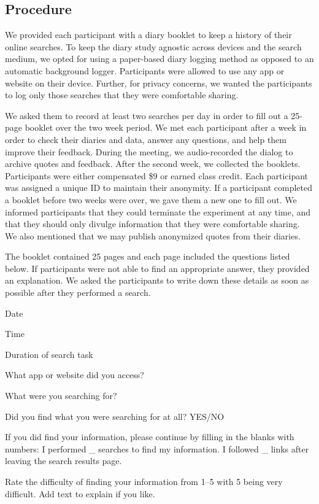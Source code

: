 \subsection{Procedure}
We provided each participant with a diary booklet to keep a history of their online searches. To keep the diary study agnostic across devices and the search medium, we opted for using a paper-based diary logging method as opposed to an automatic background logger. Participants were allowed to use any app or website on their device. Further, for privacy concerns, we wanted the participants to log only those searches that they were comfortable sharing. 

We asked them to record at least two searches per day in order to fill out a 25-page booklet over the two week period. We met each participant after a week in order to check their diaries and data, answer any questions, and help them improve their feedback. During the meeting, we audio-recorded the dialog to archive quotes and feedback. After the second week, we collected the booklets. Participants were either compensated \$9 or earned class credit. Each participant was assigned a unique ID to maintain their anonymity. If a participant completed a booklet before two weeks were over, we gave them a new one to fill out. We informed participants that they could terminate the experiment at any time, and that they should only divulge information that they were comfortable sharing. We also mentioned that we may publish anonymized quotes from their diaries. 

The booklet contained 25 pages and each page included the questions listed below. If participants were not able to find an appropriate answer, they provided an explanation. We asked the participants to write down these details as soon as possible after they performed a search. 

\begin{tight_enumerate}
            \item Date
            \item Time
            \item Duration of search task 
            \item What app or website did you access?
            \item What were you searching for?
            \item Did you find what you were searching for at all? YES/NO
            \item If you did find your information, please continue by filling in the blanks with numbers: I performed \_ searches to find my information. I followed \_ links after leaving the search results page.
            \item Rate the difficulty of finding your information from 1--5 with 5 being very difficult. Add text to explain if you like.
\end{tight_enumerate}


